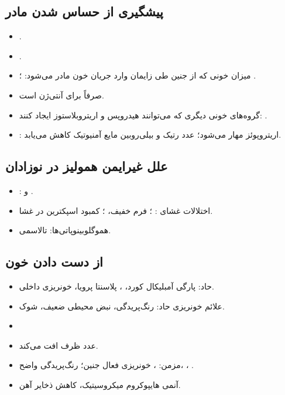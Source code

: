 \documentclass[12pt,a4paper]{article}
\begin{document}
\subsection*{پیشگیری از حساس شدن مادر}
\begin{itemize}
\item {}.
\item {}.
\item میزان خونی که از جنین طی زایمان وارد جریان خون مادر می‌شود:
؛ .
\item {} صرفاً برای آنتی‌ژن  است.
\item گروه‌های خونی دیگری که می‌توانند هیدروپس و اریتروبلاستوز ایجاد کنند:
.
\item {}: اریتروپوئز مهار می‌شود؛
عدد رتیک و بیلی‌روبین مایع آمنیوتیک کاهش می‌یابد.
\end{itemize}
\subsection*{علل غیرایمن همولیز در نوزادان}
\begin{itemize}
\item {}:
 و .
\item اختلالات غشای : ؛ فرم  خفیف،
؛ کمبود اسپکترین در غشا.
\item هموگلوبینوپاتی‌ها: تالاسمی.
\end{itemize}

\subsection*{از دست دادن خون}
\begin{itemize}
\item حاد: پارگی آمبلیکال کورد، ،
پلاسنتا پرویا، خونریزی داخلی.
\item علائم خونریزی حاد: رنگ‌پریدگی، نبض محیطی ضعیف، شوک.
\item {}
\item عدد  ظرف  افت می‌کند.
\item مزمن: ، خونریزی فعال جنین؛ رنگ‌پریدگی واضح،
، .
\item آنمی هایپوکروم میکروسیتیک، کاهش ذخایر آهن.
\end{itemize}
\end{document}
